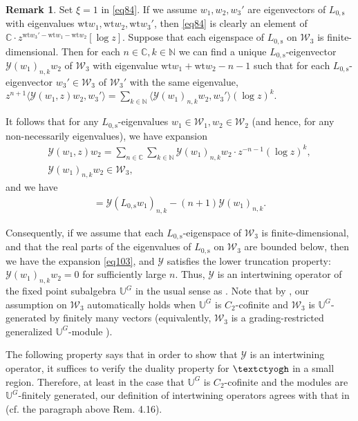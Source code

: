 \documentclass[11pt,b5paper,notitlepage]{article}
\theoremstyle{definition}
\newtheorem{rem}[df]{Remark}
\theoremstyle{plain}
\newcommand{\mc}{\mathcal}
\newcommand{\bk}[1]{\langle {#1}\rangle}
\newcommand{\Ubb}{\mathbb U}
\newcommand{\Cbb}{\mathbb C}
\newcommand{\Nbb}{\mathbb N}
\newcommand{\wt}{\mathrm{wt}}
\newcommand{\Lss}{{L_{0,\mathrm{s}}}}
\newcommand{\tipaz}{\text{\textctyogh}}
\numberwithin{equation}{subsection}
\begin{document}
\begin{rem}
Set $\xi=1$ in \eqref{eq84}. If we assume $w_1,w_2,w_3'$ are eigenvectors of $\Lss$ with eigenvalues $\wt w_1,\wt w_2,\wt w_3'$, then \eqref{eq84} is clearly an element of $\Cbb\cdot z^{\wt w_3'-\wt w_1-\wt w_2}[\log z]$. Suppose that each eigenspace of $\Lss$ on $\mc W_3$ is finite-dimensional. Then for each $n\in\Cbb, k\in\Nbb$ we can find a unique $\Lss$-eigenvector $\mc Y(w_1)_{n,k}w_2$ of $\mc W_3$ with eigenvalue $\wt w_1+\wt w_2-n-1$ such that for each $\Lss$-eigenvector $w_3'\in\mc W_3$ of $\mc W_3'$ with the same eigenvalue, $z^{n+1}\bk{\mc Y(w_1,z)w_2,w_3'}=\sum_{k\in\Nbb}\bk{\mc Y(w_1)_{n,k}w_2,w_3'}(\log z)^k$. 

It follows that for any $\Lss$-eigenvalues $w_1\in\mc W_1,w_2\in\mc W_2$ (and hence, for any non-necessarily eigenvalues), we have expansion
\begin{gather}
	\mc Y(w_1,z)w_2=\sum_{n\in\Cbb}\sum_{k\in\Nbb}\mc Y(w_1)_{n,k}w_2\cdot z^{-n-1}(\log z)^k,\nonumber\\	
\mc Y(w_1)_{n,k}w_2\in\mc W_3,	\label{eq103}
\end{gather}
and we have
\begin{align}
[\Lss,\mc Y(w_1)_{n,k}]=\mc Y(\Lss w_1)_{n,k}-(n+1)\mc Y(w_1)_{n,k}.	
\end{align}

Consequently,  if we assume that each $\Lss$-eigenspace of $\mc W_3$ is finite-dimensional, and that the real parts of the eigenvalues of $\Lss$ on $\mc W_3$ are bounded below, then we have the expansion \eqref{eq103}, and $\mc Y$ satisfies the lower truncation property: $\mc Y(w_1)_{n,k}w_2=0$ for sufficiently large $n$. Thus, $\mc Y$ is an intertwining operator of the fixed point subalgebra $\Ubb^G$ in the usual sense as \cite{HLZ10}. Note that by \cite[Lemma 2.4]{Miy04}, our assumption on $\mc W_3$ automatically holds when $\Ubb^G$ is $C_2$-cofinite and $\mc W_3$ is $\Ubb^G$-generated by finitely many vectors (equivalently, $\mc W_3$ is a grading-restricted generalized $\Ubb^G$-module \cite[Cor. 3.16]{Hua09}).
\end{rem}






The following property says that in order to show that $\mc Y$ is an intertwining operator, it suffices to verify the duality property for  $\tipaz$ in a small region. Therefore, at least in the case that $\Ubb^G$ is $C_2$-cofinite and the modules are $\Ubb^G$-finitely generated, our definition of intertwining operators agrees with that in \cite{McR21} (cf. the paragraph above Rem. 4.16).
\end{document}
